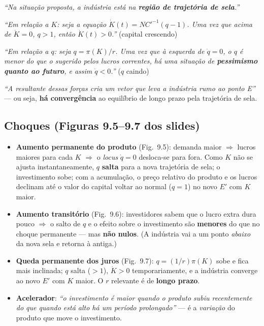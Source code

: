 \documentclass[12pt, a4paper]{article}
\begin{document}
\begin{correctbox}[title={Chave oficial (Q5): a situação ``acima de $\dot K=0$ e à esquerda de $\dot q=0$''}]
\emph{``Na situação proposta, a indústria está na \textbf{região de trajetória
de sela}.''}

\emph{``Em relação a $K$: seja a equação $\dot K(t) = NC'^{-1}(q-1)$. Uma vez
que acima de $\dot K = 0$, $q > 1$, então $\dot K(t) > 0$.''} (capital
crescendo)

\emph{``Em relação a $q$: seja $q = \pi(K)/r$. Uma vez que à esquerda de
$\dot q = 0$, o $q$ é menor do que o sugerido pelos lucros correntes, há uma
situação de \textbf{pessimismo quanto ao futuro}, e assim $\dot q < 0$.''}
($q$ caindo)

\emph{``A resultante dessas forças cria um vetor que leva a indústria rumo ao
ponto E''} --- ou seja, \textbf{há convergência} ao equilíbrio de longo prazo
pela trajetória de sela.
\end{correctbox}

\subsection{Choques (Figuras 9.5--9.7 dos slides)}

\begin{itemize}[leftmargin=1.4em]
\item \textbf{Aumento permanente do produto} (Fig.\ 9.5): demanda maior
$\Rightarrow$ lucros maiores para cada $K$ $\Rightarrow$ o \emph{locus}
$\dot q = 0$ desloca-se para fora. Como $K$ não se ajusta instantaneamente,
$q$ \textbf{salta} para a nova trajetória de sela; o investimento sobe; com a
acumulação, o preço relativo do produto e os lucros declinam até o valor do
capital voltar ao normal ($q = 1$) no novo $E'$ com $K$ maior.
\item \textbf{Aumento transitório} (Fig.\ 9.6): investidores sabem que o lucro
extra dura pouco $\Rightarrow$ o salto de $q$ e o efeito sobre o investimento
são \textbf{menores} do que no choque permanente --- mas \textbf{não nulos}.
(A indústria vai a um ponto \emph{abaixo} da nova sela e retorna à antiga.)
\item \textbf{Queda permanente dos juros} (Fig.\ 9.7): $q = (1/r)\pi(K)$ sobe
e fica mais inclinada; $q$ salta ($>1$), $\dot K > 0$ temporariamente, e a
indústria converge ao novo $E'$ com $K$ maior. O $r$ relevante é de
\textbf{longo prazo}.
\item \textbf{Acelerador}: \emph{``o investimento é maior quando o produto
subiu recentemente do que quando está alto há um período prolongado''} --- é a
\emph{variação} do produto que move o investimento.
\end{itemize}
\end{document}

